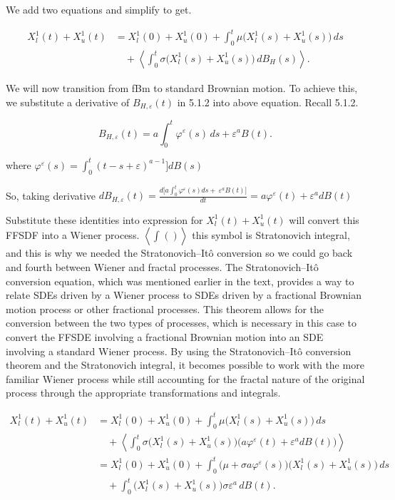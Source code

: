 \documentclass[12pt,a4paper]{report}
\numberwithin{equation}{section}
\begin{document}
We add two equations and simplify to get.

\[
\begin{aligned}
X_{l}^{1}(t)+X_{u}^{1}(t)
&= X_{l}^{1}(0)+X_{u}^{1}(0)
+ \int_{0}^{t}\mu\bigl(X_{l}^{1}(s)+X_{u}^{1}(s)\bigr)\,ds \\
&\quad + \left\langle \int_{0}^{t}\sigma\bigl(X_{l}^{1}(s)+X_{u}^{1}(s)\bigr)\,dB_{H}(s)\right\rangle .
\end{aligned}
\]



We will now transition from fBm to standard Brownian motion. To achieve
this, we substitute a derivative of \(B_{H,\varepsilon}(t)\) in 5.1.2
into above equation. Recall 5.1.2.

\[
B_{H,\varepsilon}(t)=a\int_{0}^{t}\varphi^{\varepsilon}(s)\,ds+\varepsilon^{a}B(t).
\]

where
\(\varphi^{\varepsilon}(s) = \int_{0}^{t}{(t - s + \varepsilon)^{a - 1}\rbrack dB(s)}\)

So, taking derivative
\(dB_{H,\varepsilon}(t) = \frac{d\lbrack a\int_{0}^{t}{\varphi^{\varepsilon}(s)ds + \ \varepsilon^{a}B(t)\rbrack}}{dt} = a\varphi^{\varepsilon}(t) + \varepsilon^{a}dB(t)\)

Substitute these identities into expression for
\(X_{l}^{1}(t) + X_{u}^{1}(t)\) will convert this FFSDF into a Wiener
process. \(\left\langle \int_{}^{}{()} \right\rangle\) this symbol is
Stratonovich integral, and this is why we needed the Stratonovich--Itô
conversion so we could go back and
fourth between Wiener and fractal processes. The Stratonovich--Itô
conversion equation, which was mentioned
earlier in the text, provides a way to relate SDEs driven by a Wiener
process to SDEs driven by a fractional Brownian motion process or other
fractional processes. This theorem allows for the conversion between the
two types of processes, which is necessary in this case to convert the
FFSDE involving a fractional Brownian motion into an SDE involving a
standard Wiener process. By using the Stratonovich--Itô conversion
theorem and the Stratonovich integral, it
becomes possible to work with the more familiar Wiener process while
still accounting for the fractal nature of the original process through
the appropriate transformations and integrals.

\[
\begin{aligned}
X_{l}^{1}(t)+X_{u}^{1}(t)
&= X_{l}^{1}(0)+X_{u}^{1}(0)
+ \int_{0}^{t}\mu\bigl(X_{l}^{1}(s)+X_{u}^{1}(s)\bigr)\,ds \\
&\quad + \left\langle \int_{0}^{t}\sigma\bigl(X_{l}^{1}(s)+X_{u}^{1}(s)\bigr)\bigl(a\varphi^{\varepsilon}(t)+\varepsilon^{a}dB(t)\bigr)\right\rangle \\
&= X_{l}^{1}(0)+X_{u}^{1}(0)
+ \int_{0}^{t}\bigl(\mu+\sigma a\varphi^{\varepsilon}(s)\bigr)\bigl(X_{l}^{1}(s)+X_{u}^{1}(s)\bigr)\,ds \\
&\quad + \int_{0}^{t}\bigl(X_{l}^{1}(s)+X_{u}^{1}(s)\bigr)\sigma\varepsilon^{a}\,dB(t).
\end{aligned}
\]
\end{document}
